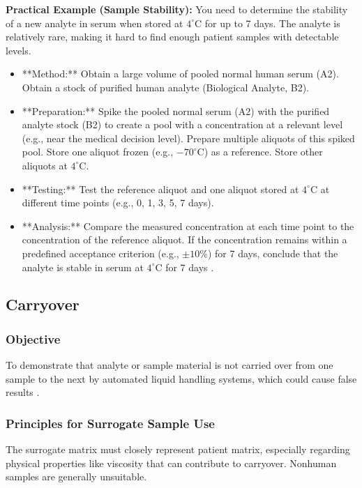 \documentclass{article}
\begin{document}
\textbf{Practical Example (Sample Stability):}
You need to determine the stability of a new analyte in serum when stored at $4^\circ$C for up to 7 days. The analyte is relatively rare, making it hard to find enough patient samples with detectable levels.
\begin{itemize}
    \item **Method:** Obtain a large volume of pooled normal human serum (A2). Obtain a stock of purified human analyte (Biological Analyte, B2).
    \item **Preparation:** Spike the pooled normal serum (A2) with the purified analyte stock (B2) to create a pool with a concentration at a relevant level (e.g., near the medical decision level). Prepare multiple aliquots of this spiked pool. Store one aliquot frozen (e.g., $-70^\circ$C) as a reference. Store other aliquots at $4^\circ$C.
    \item **Testing:** Test the reference aliquot and one aliquot stored at $4^\circ$C at different time points (e.g., 0, 1, 3, 5, 7 days).
    \item **Analysis:** Compare the measured concentration at each time point to the concentration of the reference aliquot. If the concentration remains within a predefined acceptance criterion (e.g., $\pm 10\%$) for 7 days, conclude that the analyte is stable in serum at $4^\circ$C for 7 days \cite{CLSIEP35}.

\end{itemize}

\subsection{Carryover}

\subsubsection{Objective}
To demonstrate that analyte or sample material is not carried over from one sample to the next by automated liquid handling systems, which could cause false results \cite{CLSIEP39Ed1E}.

\subsubsection{Principles for Surrogate Sample Use}
The surrogate matrix must closely represent patient matrix, especially regarding physical properties like viscosity that can contribute to carryover. Nonhuman samples are generally unsuitable.
\end{document}
